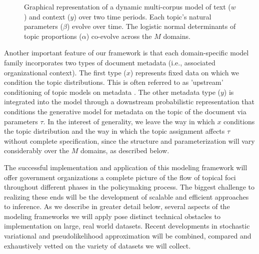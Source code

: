 \begin{figure}
\begin{center}
\end{center}
\vspace{-.3cm}
\caption{Graphical representation of a dynamic multi-corpus model of text ($w$) and context ($y$) over two time periods. Each topic's natural parameters ($\beta$) evolve over time. The logistic normal determinants of topic proportions ($\alpha$) co-evolve across the $M$ domains.}
\vspace{-.15cm}

\label{plates}


\end{figure}


Another important feature of our framework is that each
domain-specific model family incorporates two types of document metadata (i.e., associated organizational context). The first type ($x$) represents fixed data on which we condition the topic distributions. This is often referred to as 'upstream' conditioning of topic models on metadata \cite{Mimno2012,Mimno2008}. The other metadata type ($y$) is integrated into the model through a downstream probabilistic representation that conditions the generative model for metadata on the topic of the document via parameters $\tau$. In the interest of generality, we leave the way in which $x$ conditions the topic distribution and the way in which the topic assignment affects $\tau$  without complete
specification, since the structure and parameterization
will vary considerably over the $M$ domains, as described below. \vspace{.1cm}

The successful implementation and application of this modeling framework will offer government organizations a complete picture of the flow of topical foci throughout different phases in the policymaking process. The biggest challenge to realizing these ends will be the development of scalable and efficient approaches to inference. As we describe in greater detail below, several aspects of the modeling frameworks we will apply pose distinct technical obstacles to implementation on large, real world datasets. Recent developments in stochastic variational \cite{Hoffman2010,Mimno2012b,Gopalan2012} and pseudolikelihood approximation \cite{Sutton2007,Desmarais2010} will be combined, compared and exhaustively vetted on the variety of datasets we will collect.



